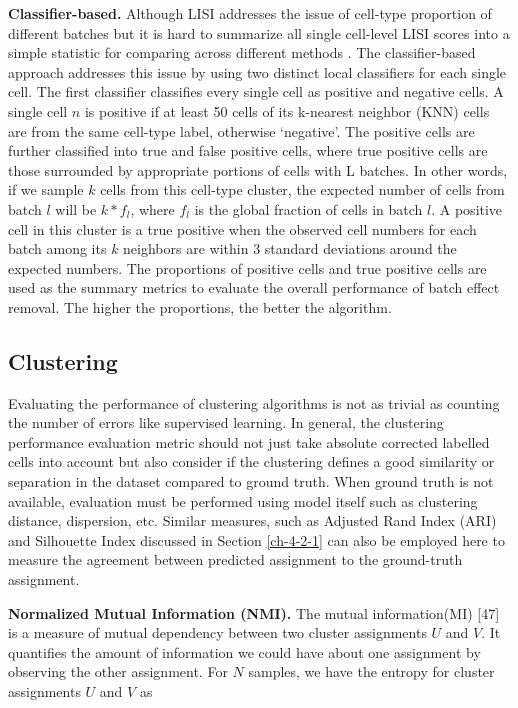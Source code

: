 \documentclass[
]{book}
\begin{document}
\textbf{Classifier-based.} Although LISI addresses the issue of cell-type proportion of different batches but it is hard to summarize all single cell-level LISI scores into a simple statistic for comparing across different methods \citep{RN53}. The classifier-based approach addresses this issue by using two distinct local classifiers for each single cell. The first classifier classifies every single cell as positive and negative cells. A single cell \(n\) is positive if at least 50\(%
\) cells of its k-nearest neighbor (KNN) cells are from the same cell-type label, otherwise `negative'. The positive cells are further classified into true and false positive cells, where true positive cells are those surrounded by appropriate portions of cells with L batches. In other words, if we sample \(k\) cells from this cell-type cluster, the expected number of cells from batch \(l\) will be \(k*f_{l}\), where \(f_{l}\) is the global fraction of cells in batch \(l\). A positive cell in this cluster is a true positive when the observed cell numbers for each batch among its \(k\) neighbors are within 3 standard deviations around the expected numbers. The proportions of positive cells and true positive cells are used as the summary metrics to evaluate the overall performance of batch effect removal. The higher the proportions, the better the algorithm.

\hypertarget{ch-4-1-3}{%
\subsection{Clustering}\label{ch-4-1-3}}

Evaluating the performance of clustering algorithms is not as trivial as counting the number of errors like supervised learning. In general, the clustering performance evaluation metric should not just take absolute corrected labelled cells into account but also consider if the clustering defines a good similarity or separation in the dataset compared to ground truth. When ground truth is not available, evaluation must be performed using model itself such as clustering distance, dispersion, etc. Similar measures, such as Adjusted Rand Index (ARI) and Silhouette Index discussed in Section \ref{ch-4-2-1} can also be employed here to measure the agreement between predicted assignment to the ground-truth assignment.

\textbf{Normalized Mutual Information (NMI).} The mutual information(MI) {[}47{]} is a measure of mutual dependency between two cluster assignments \(U\) and \(V\). It quantifies the amount of information we could have about one assignment by observing the other assignment. For \(N\) samples, we have the entropy for cluster assignments \(U\) and \(V\) as
\end{document}
